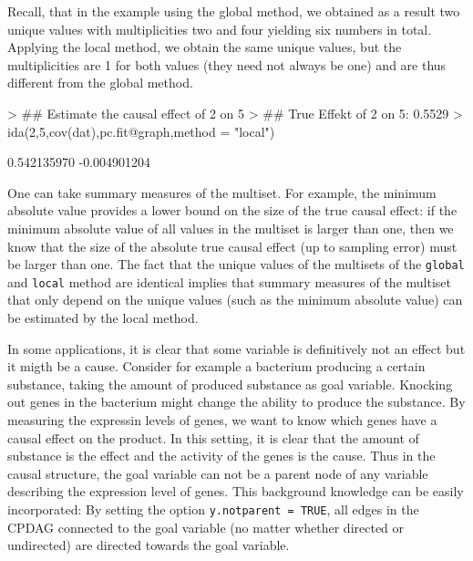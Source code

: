 \documentclass[article]{jss}
\begin{document}
Recall, that in the example using the global method, we obtained as a
result two unique values with multiplicities two and four yielding six
numbers in total.  Applying the local method, we obtain the same unique
values, but the multiplicities are 1 for both values (they need not always
be one) and are thus different from the global method.
\begin{Schunk}
\begin{Sinput}
> ## Estimate the causal effect of 2 on 5
> ## True Effekt of 2 on 5: 0.5529
> ida(2,5,cov(dat),pc.fit@graph,method = "local")
\end{Sinput}
\begin{Soutput}
[1]  0.542135970 -0.004901204
\end{Soutput}
\end{Schunk}

One can take summary measures of the multiset. For example, the minimum
absolute value provides a lower bound on the size of the true causal
effect: if the minimum absolute value of all values in the multiset is
larger than one, then we know that the size of the absolute true causal
effect (up to sampling error) must be larger than one. The fact that the
unique values of the multisets of the \texttt{global} and \texttt{local}
method are identical implies that summary measures of the multiset that
only depend on the unique values (such as the minimum absolute value) can
be estimated by the local method.

In some applications, it is clear that some variable is definitively not an
effect but it migth be a cause. Consider for example a bacterium producing
a certain substance, taking the amount of produced substance as goal
variable. Knocking out genes in the bacterium might change the ability to
produce the substance. By measuring the expressin levels of genes, we want
to know which genes have a causal effect on the product. In this setting,
it is clear that the amount of substance is the effect and the activity of
the genes is the cause. Thus in the causal structure, the goal variable can
not be a parent node of any variable describing the expression level of
genes. This background knowledge can be easily incorporated: By setting the
option \texttt{y.notparent = TRUE}, all edges in the CPDAG connected to the
goal variable (no matter whether directed or undirected) are directed
towards the goal variable.
\end{document}
